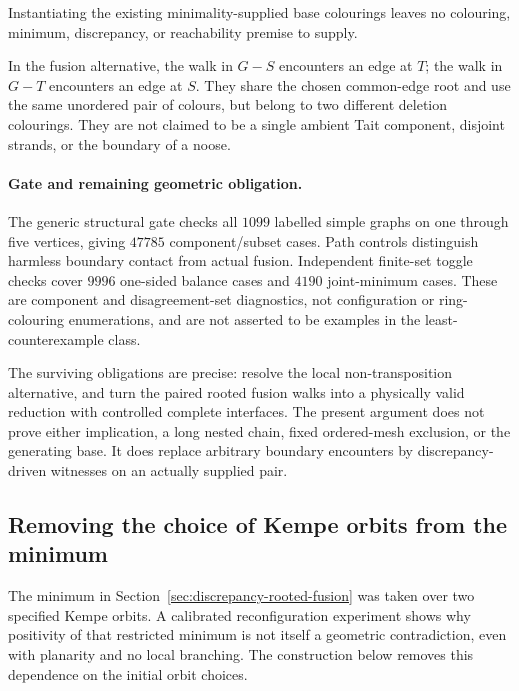 Instantiating the existing minimality-supplied base colourings leaves
no colouring, minimum, discrepancy, or reachability premise to supply.

In the fusion alternative, the walk in $G-S$ encounters an edge at $T$;
the walk in $G-T$ encounters an edge at $S$. They share the chosen
common-edge root and use the same unordered pair of colours, but belong
to two different deletion colourings. They are not claimed to be a
single ambient Tait component, disjoint strands, or the boundary of a noose.

\paragraph{Gate and remaining geometric obligation.}
The generic structural gate checks all $1099$ labelled simple graphs
on one through five vertices, giving $47785$ component/subset cases.
Path controls distinguish harmless boundary contact from actual fusion.
Independent finite-set toggle checks cover $9996$ one-sided balance cases
and $4190$ joint-minimum cases. These are component and disagreement-set
diagnostics, not configuration or ring-colouring enumerations, and are
not asserted to be examples in the least-counterexample class.

The surviving obligations are precise: resolve the local
non-transposition alternative, and turn the paired rooted fusion walks
into a physically valid reduction with controlled complete interfaces.
The present argument does not prove either implication, a long nested
chain, fixed ordered-mesh exclusion, or the generating base. It does
replace arbitrary boundary encounters by discrepancy-driven witnesses
on an actually supplied pair.

\subsection{Removing the choice of Kempe orbits from the minimum}
\label{sec:absolute-deletion-minimum}

The minimum in Section~\ref{sec:discrepancy-rooted-fusion} was taken
over two specified Kempe orbits. A calibrated reconfiguration experiment
shows why positivity of that restricted minimum is not itself a geometric
contradiction, even with planarity and no local branching. The construction
below removes this dependence on the initial orbit choices.

